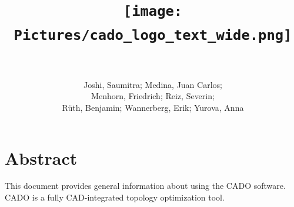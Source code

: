 \documentclass[
12pt, %
a4paper, %
oneside, %
headinclude,footinclude, %
BCOR5mm, %
]{scrartcl}
\title{\texttt{[image: Pictures/cado\_logo\_text\_wide.png]} \\ \normalfont\spacedallcaps{User Guide} \\
\vspace*{\fill}}%
\author{Joshi, Saumitra; Medina, Juan Carlos; \\ Menhorn, Friedrich; Reiz, Severin;\\ R{\"u}th, Benjamin;  Wannerberg, Erik; Yurova, Anna}%
\begin{document}
\newcommand{\titlebox}[2]{
\begin{tikzpicture}
\node[draw,thick,inner sep=6mm] (titlebox) {#2};
\node[fill=white] (Title) at (titlebox.north) {\bfseries \large #1};
\end{tikzpicture}
}
\renewcommand{\sectionmark}[1]{\markright{\spacedlowsmallcaps{#1}}} %

\newcommand{\titledframe}[2]{%
       \boxput*(0,1){\psframebox*{#1}}%
         {\psframebox[framesep=12pt]{#2}}}
         
\pagestyle{scrheadings} %



\maketitle %

\setcounter{tocdepth}{2} %
\newpage
\tableofcontents %




\section*{Abstract} %
This document provides general information about using the CADO software. CADO is a fully CAD-integrated topology optimization tool.
\end{document}
